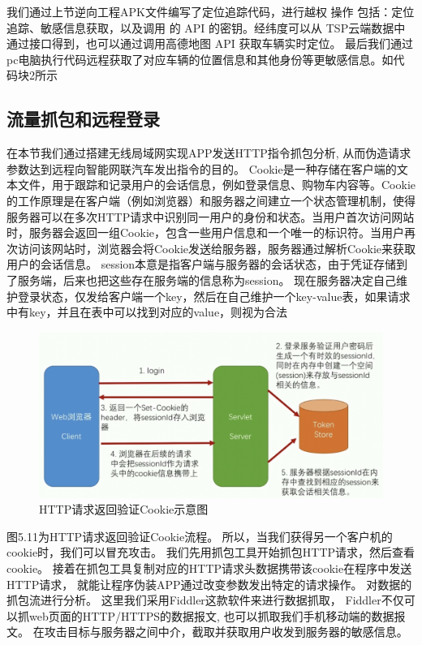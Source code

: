 我们通过上节逆向工程APK文件编写了定位追踪代码，进行越权
操作 包括：定位追踪、敏感信息获取，以及调用
的 API 的密钥。经纬度可以从 TSP云端数据中通过接口得到，也可以通过调用高德地图 API 获取车辆实时定位。
最后我们通过pc电脑执行代码远程获取了对应车辆的位置信息和其他身份等更敏感信息。如代码块2所示

\subsection{流量抓包和远程登录}
在本节我们通过搭建无线局域网实现APP发送HTTP指令抓包分析, 从而伪造请求参数达到远程向智能网联汽车发出指令的目的。
Cookie是一种存储在客户端的文本文件，用于跟踪和记录用户的会话信息，例如登录信息、购物车内容等。Cookie的工作原理是在客户端（例如浏览器）和服务器之间建立一个状态管理机制，使得服务器可以在多次HTTP请求中识别同一用户的身份和状态。当用户首次访问网站时，服务器会返回一组Cookie，包含一些用户信息和一个唯一的标识符。当用户再次访问该网站时，浏览器会将Cookie发送给服务器，服务器通过解析Cookie来获取用户的会话信息。
session本意是指客户端与服务器的会话状态，由于凭证存储到了服务端，后来也把这些存在服务端的信息称为session。
现在服务器决定自己维护登录状态，仅发给客户端一个key，然后在自己维护一个key-value表，如果请求中有key，并且在表中可以找到对应的value，则视为合法
\begin{figure}
  \centering
  \includegraphics[scale=0.5]{resources/img/i25.png}
  \caption{HTTP请求返回验证Cookie示意图}
\end{figure} 
图5.11为HTTP请求返回验证Cookie流程。
所以，当我们获得另一个客户机的 cookie时，我们可以冒充攻击。
我们先用抓包工具开始抓包HTTP请求，然后查看cookie。
接着在抓包工具复制对应的HTTP请求头数据携带该cookie在程序中发送HTTP请求，
就能让程序伪装APP通过改变参数发出特定的请求操作。
对数据的抓包流进行分析。
这里我们采用Fiddler\cite{crane2015fiddler}这款软件来进行数据抓取， Fiddler不仅可以抓web页面的HTTP/HTTPS的数据报文, 也可以抓取我们手机移动端的数据报文。
在攻击目标与服务器之间中介，截取并获取用户收发到服务器的敏感信息。
